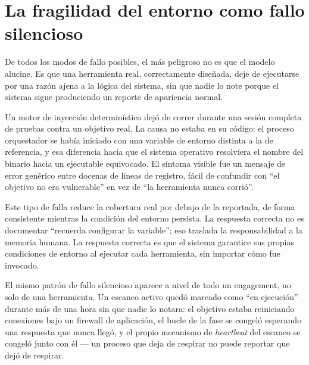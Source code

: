 \documentclass[10pt]{article}
\begin{document}
\section{La fragilidad del entorno como fallo silencioso}

De todos los modos de fallo posibles, el más peligroso no es que el modelo alucine. Es que una herramienta real, correctamente diseñada, deje de ejecutarse por una razón ajena a la lógica del sistema, sin que nadie lo note porque el sistema sigue produciendo un reporte de apariencia normal.

Un motor de inyección determinístico dejó de correr durante una sesión completa de pruebas contra un objetivo real. La causa no estaba en su código: el proceso orquestador se había iniciado con una variable de entorno distinta a la de referencia, y esa diferencia hacía que el sistema operativo resolviera el nombre del binario hacia un ejecutable equivocado. El síntoma visible fue un mensaje de error genérico entre docenas de líneas de registro, fácil de confundir con ``el objetivo no era vulnerable'' en vez de ``la herramienta nunca corrió''.

Este tipo de falla reduce la cobertura real por debajo de la reportada, de forma consistente mientras la condición del entorno persista. La respuesta correcta no es documentar ``recuerda configurar la variable''; eso traslada la responsabilidad a la memoria humana. La respuesta correcta es que el sistema garantice sus propias condiciones de entorno al ejecutar cada herramienta, sin importar cómo fue invocado.

El mismo patrón de fallo silencioso aparece a nivel de todo un engagement, no solo de una herramienta. Un escaneo activo quedó marcado como ``en ejecución'' durante más de una hora sin que nadie lo notara: el objetivo estaba reiniciando conexiones bajo un firewall de aplicación, el bucle de la fase se congeló esperando una respuesta que nunca llegó, y el propio mecanismo de \textit{heartbeat} del escaneo se congeló junto con él --- un proceso que deja de respirar no puede reportar que dejó de respirar.
\end{document}
